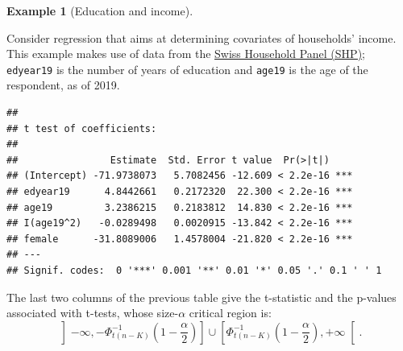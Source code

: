 \documentclass[
  12pt,
]{book}
\newenvironment{Shaded}{\begin{snugshade}}{\end{snugshade}}
\newcommand{\AttributeTok}[1]{\textcolor[rgb]{0.77,0.63,0.00}{#1}}
\newcommand{\DecValTok}[1]{\textcolor[rgb]{0.00,0.00,0.81}{#1}}
\newcommand{\FunctionTok}[1]{\textcolor[rgb]{0.00,0.00,0.00}{#1}}
\newcommand{\NormalTok}[1]{#1}
\newcommand{\OtherTok}[1]{\textcolor[rgb]{0.56,0.35,0.01}{#1}}
\newcommand{\SpecialCharTok}[1]{\textcolor[rgb]{0.00,0.00,0.00}{#1}}
\theoremstyle{definition}
\theoremstyle{definition}
\newtheorem{example}{Example}[chapter]
\theoremstyle{definition}
\theoremstyle{definition}
\theoremstyle{remark}
\begin{document}
\begin{example}[Education and income]
\protect\hypertarget{exm:SHP0001}{}\label{exm:SHP0001}

Consider regression that aims at determining covariates of households' income. This example makes use of data from the \href{https://forscenter.ch/projects/swiss-household-panel/}{Swiss Household Panel (SHP)}; \texttt{edyear19} is the number of years of education and \texttt{age19} is the age of the respondent, as of 2019.

\begin{Shaded}
\end{Shaded}

\begin{verbatim}
## 
## t test of coefficients:
## 
##                Estimate  Std. Error t value  Pr(>|t|)    
## (Intercept) -71.9738073   5.7082456 -12.609 < 2.2e-16 ***
## edyear19      4.8442661   0.2172320  22.300 < 2.2e-16 ***
## age19         3.2386215   0.2183812  14.830 < 2.2e-16 ***
## I(age19^2)   -0.0289498   0.0020915 -13.842 < 2.2e-16 ***
## female      -31.8089006   1.4578004 -21.820 < 2.2e-16 ***
## ---
## Signif. codes:  0 '***' 0.001 '**' 0.01 '*' 0.05 '.' 0.1 ' ' 1
\end{verbatim}

\end{example}

The last two columns of the previous table give the t-statistic and the p-values associated with t-tests, whose size-\(\alpha\) critical region is:
\[
\left]-\infty,-\Phi^{-1}_{t(n-K)}\left(1-\frac{\alpha}{2}\right)\right] \cup \left[\Phi^{-1}_{t(n-K)}\left(1-\frac{\alpha}{2}\right),+\infty\right[.
\]
\end{document}
